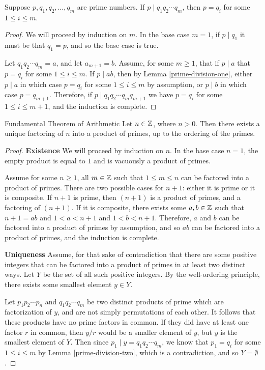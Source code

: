 \begin{lemma}\label{prime-division-two}
    Suppose $p, q_1, q_2, \ldots, q_m$ are prime numbers. If $p \mid q_1q_2\cdots q_m$, then $p = q_i$ for some $1 \leq i \leq m$.
\end{lemma}

\begin{proof}
    We will proceed by induction on $m$. In the base case $m = 1$, if $p\mid q_1$ it must be that $q_1 = p$, and so the base case is true.

    Let $q_1q_2\cdots q_m = a$, and let $a_{m+1} = b$. Assume, for some $m \geq 1$, that if $p \mid a$ that $p = q_i$ for some $1 \leq i \leq m$. If $p \mid ab$, then by Lemma \ref{prime-division-one}, either $p \mid a$ in which case $p = q_i$ for some $1 \leq i \leq m$ by assumption, or  $p \mid b$ in which case $p = q_{m+1}$. Therefore, if $p \mid q_1q_2\cdots q_mq_{m+1}$ we have $p = q_i$ for some $1 \leq i \leq m+1$, and the induction is complete.
\end{proof}

\begin{thm}\label{fundmental-theorem-arithmetic}Fundamental Theorem of Arithmetic\proofbreak
    Let $n \in \mathbb{Z}$, where $n > 0$. Then there exists a unique factoring of $n$ into a product of primes, up to the ordering of the primes.
\end{thm}

\begin{proof}\proofbreak
\textbf{Existence} We will proceed by induction on $n$. In the base case $n=1$, the empty product is equal to $1$ and is vacuously a product of primes.

Assume for some $n \geq 1$, all $m \in \mathbb{Z}$ such that $1 \leq m \leq n$ can be factored into a product of primes. There are two possible cases for $n+1$: either it is prime or it is composite. If $n+1$ is prime, then $(n+1)$ is a product of primes, and a factoring of $(n+1)$. If it is composite, there exists some $a, b \in \mathbb{Z}$ such that $n+1 = ab$ and $1 < a < n+1$ and $1 < b < n+1$. Therefore, $a$ and $b$ can be factored into a product of primes by assumption, and so $ab$ can be factored into a product of primes, and the induction is complete.

\textbf{Uniqueness} Assume, for that sake of contradiction that there are some positive integers that can be factored into a product of primes in at least two distinct ways. Let $Y$ be the set of all such positive integers. By the well-ordering principle, there exists some smallest element $y \in Y$.

Let $p_1p_2\cdots p_n$ and $q_1q_2\cdots q_m$ be two distinct products of prime which are factorization of $y$, and are not simply permutations of each other. It follows that these products have no prime factors in common. If they did have at least one factor $r$ in common, then $y/r$ would be a smaller element of $y$, but $y$ is the smallest element of $Y$. Then since $p_1 \mid y = q_1q_2\cdots q_m$, we know that $p_1 = q_i$ for some $1 \leq i \leq m$ by Lemma \ref{prime-division-two}, which is a contradiction, and so $Y = \emptyset$.
\end{proof}

